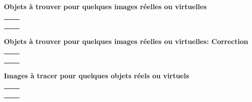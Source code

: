 \documentclass{article}
\newcommand{\titre}[1]{
\begin{center}
  {\Large\textbf{#1}}
\end{center}

}
\begin{document}
\titre{Objets \`a trouver pour quelques images r\'eelles ou virtuelles}
\begin{tabular}{|c|c|}
\hline
&\\ \hline
&\\ \hline
&\\ \hline
&\\ \hline
\end{tabular}


\newpage


\titre{Objets \`a trouver pour quelques images r\'eelles ou virtuelles: Correction}
\begin{tabular}{|c|c|}
\hline
&\\ \hline
&\\ \hline
&\\ \hline
&\\ \hline
\end{tabular}


\newpage
\setcounter{page}{1}
\titre{Images \`a tracer pour quelques objets r\'eels ou virtuels}
\begin{tabular}{|c|c|}
\hline
&\\ \hline
&\\ \hline
&\\ \hline
&\\ \hline
\end{tabular}


\newpage
\end{document}
